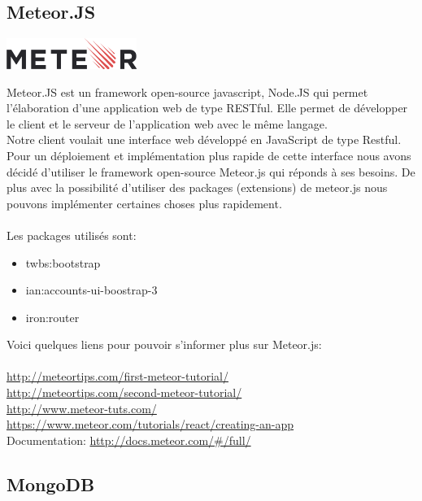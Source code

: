 \subsection{Meteor.JS \cite{Meteor.JS}}
\begin{center}
\includegraphics[height=1cm]{img/Meteor-logo.png}
\end{center}

Meteor.JS est un framework open-source javascript, Node.JS qui permet l'élaboration d'une application web de type RESTful. Elle permet de développer le client et le serveur de l'application web avec le même langage.\\
Notre client voulait une interface web développé en JavaScript de type Restful. Pour un déploiement et implémentation plus rapide de cette interface nous avons décidé d'utiliser le framework open-source Meteor.js qui réponds à ses besoins. De plus avec la possibilité d'utiliser des packages (extensions) de meteor.js nous pouvons implémenter certaines choses plus rapidement.\\
\\
Les packages utilisés sont:
\begin{itemize}
\item twbs:bootstrap
\item ian:accounts-ui-boostrap-3
\item iron:router
\end{itemize}

\vspace{0.5cm}
Voici quelques liens pour pouvoir s'informer plus sur Meteor.js:
\\
\\
\url{http://meteortips.com/first-meteor-tutorial/}\\
\url{http://meteortips.com/second-meteor-tutorial/}\\
\url{http://www.meteor-tuts.com/}\\
\url{https://www.meteor.com/tutorials/react/creating-an-app}\\
Documentation: \url{http://docs.meteor.com/#/full/}


\subsection{MongoDB \cite{MongoDB}}

